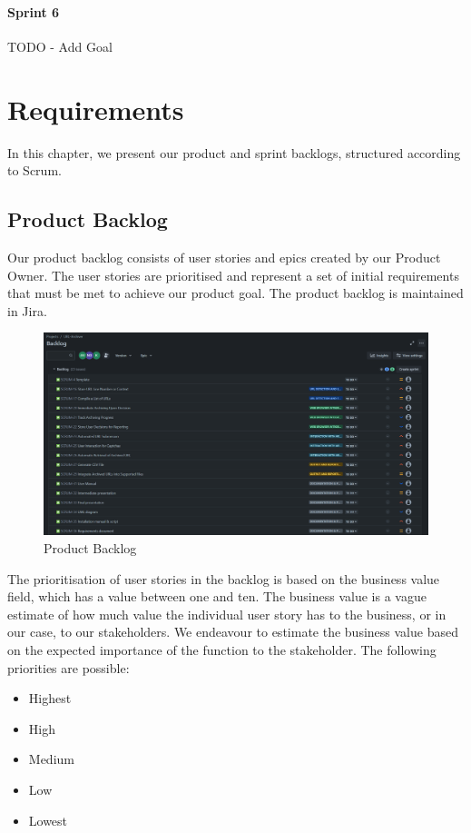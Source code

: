 \paragraph{Sprint 6}
TODO - Add Goal

\clearpage


\section{Requirements}
In this chapter, we present our product and sprint backlogs, structured according to Scrum.

\subsection{Product Backlog}
Our product backlog consists of user stories and epics created by our Product Owner.
The user stories are prioritised and represent a set of initial requirements that must be met to achieve our product goal. The product backlog is maintained in Jira.
\begin{figure}[h!]
    \centering
    \includegraphics[width=1\textwidth]{pictures/backlog}
    \caption{Product Backlog}
    \label{fig:backlog}
\end{figure}

The prioritisation of user stories in the backlog is based on the business value field, which has a value between one and ten.
The business value is a vague estimate of how much value the individual user story has to the business, or in our case, to our stakeholders.
We endeavour to estimate the business value based on the expected importance of the function to the stakeholder.
The following priorities are possible:
\begin{itemize}
    \item Highest
    \item High
    \item Medium
    \item Low
    \item Lowest
\end{itemize}

